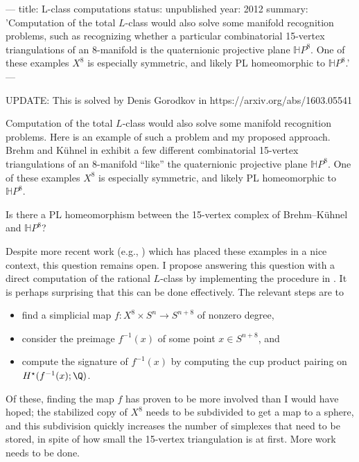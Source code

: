 ---
title: L-class computations
status: unpublished
year: 2012
summary: 'Computation of the total $L$-class would also solve some manifold recognition problems, such as recognizing whether a particular combinatorial 15-vertex triangulations of an 8-manifold is the quaternionic projective plane $\mathbb{H}P^8$.  One of these examples $X^8$ is especially symmetric, and likely PL homeomorphic to $\mathbb{H}P^8$.'
---

UPDATE: This is solved by Denis Gorodkov in https://arxiv.org/abs/1603.05541

Computation of the total $L$-class would also solve some manifold recognition problems.  Here is an example of such a problem and my proposed approach.  Brehm and K\"uhnel in \cite{MR1180457} exhibit a few different combinatorial 15-vertex triangulations of an 8-manifold ``like'' the quaternionic projective plane $\mathbb{H}P^8$.  One of these examples $X^8$ is especially symmetric, and likely PL homeomorphic to $\mathbb{H}P^8$.

\begin{question}
Is there a PL homeomorphism between the 15-vertex complex of Brehm--K\"uhnel and $\mathbb{H}P^8$?
\end{question}

Despite more recent work (e.g., \cite{MR3038783}) which has placed these examples in a nice context, this question remains open.  I propose answering this question with a direct computation of the rational $L$-class by implementing the procedure in \cite{MR440554}. It is perhaps surprising that this can be done effectively.  The relevant steps are to

\begin{itemize}
\item find a simplicial map $f : X^8 \times S^n \to S^{n+8}$ of nonzero degree,
\item consider the preimage $f^{-1}(x)$ of some point $x \in S^{n+8}$, and
\item compute the signature of $f^{-1}(x)$ by computing the cup product pairing on $H^\star(f^{-1}(x);\Q)$.
\end{itemize}

Of these, finding the map $f$ has proven to be more involved than I would have hoped; the stabilized copy of $X^8$ needs to be subdivided to get a map to a sphere, and this subdivision quickly increases the number of simplexes that need to be stored, in spite of how small the 15-vertex triangulation is at first.  More work needs to be done.
